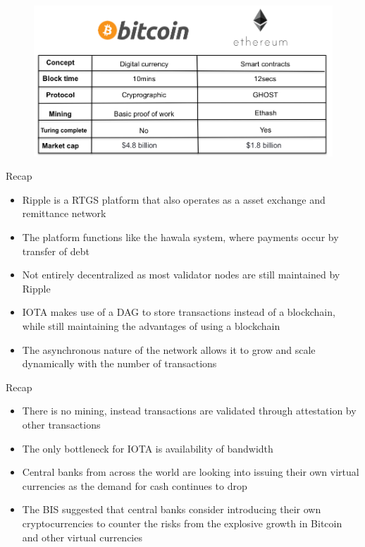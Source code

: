 \documentclass[10pt]{beamer}
\begin{document}

\begin{frame}
	\begin{figure}[]
		\centering
		\includegraphics  [scale=0.25]{Images/btcvseth}
	\end{figure}
\end{frame}


\begin{frame}{Recap}
	\begin{itemize}
		\item Ripple is a RTGS platform that also operates as a asset exchange and remittance network
		\item The platform functions like the hawala system, where payments occur by transfer of debt
		\item Not entirely decentralized as most validator nodes are still maintained by Ripple
		\item IOTA makes use of a DAG to store transactions instead of a blockchain, while still maintaining the advantages of using a blockchain
		\item The asynchronous nature of the network allows it to grow and scale dynamically with the number of transactions
	\end{itemize}
\end{frame}


\begin{frame}{Recap}
	\begin{itemize}
		\item There is no mining, instead transactions are validated through attestation by other transactions
		\item The only bottleneck for IOTA is availability of bandwidth
		\item Central banks from across the world are looking into issuing their own virtual currencies as the demand for cash continues to drop
		\item The BIS suggested that central banks consider introducing their own cryptocurrencies to counter the risks from the explosive growth in Bitcoin and other virtual currencies
	\end{itemize}
\end{frame}
\end{document}
